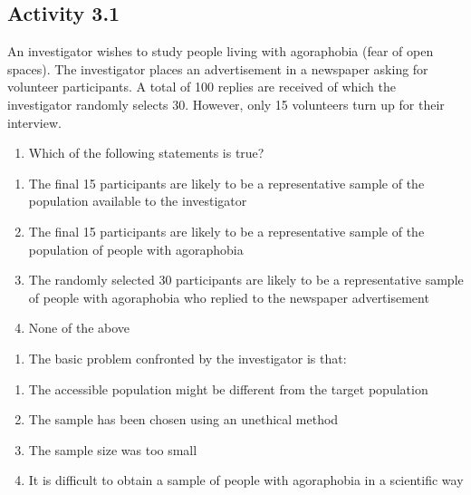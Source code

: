 \documentclass[
]{memoir}
\providecommand{\tightlist}{%
  \setlength{\itemsep}{0pt}\setlength{\parskip}{0pt}}
\begin{document}
\hypertarget{activity-3.1}{%
\subsection*{Activity 3.1}\label{activity-3.1}}

An investigator wishes to study people living with agoraphobia (fear of open spaces). The investigator places an advertisement in a newspaper asking for volunteer participants. A total of 100 replies are received of which the investigator randomly selects 30. However, only 15 volunteers turn up for their interview.

\begin{enumerate}
\def\labelenumi{\arabic{enumi}.}
\tightlist
\item
  Which of the following statements is true?
\end{enumerate}

\begin{enumerate}
\def\labelenumi{\alph{enumi})}
\tightlist
\item
  The final 15 participants are likely to be a representative sample of the population available to the investigator
\item
  The final 15 participants are likely to be a representative sample of the population of people with agoraphobia
\item
  The randomly selected 30 participants are likely to be a representative sample of people with agoraphobia who replied to the newspaper advertisement
\item
  None of the above
\end{enumerate}

\begin{enumerate}
\def\labelenumi{\arabic{enumi}.}
\setcounter{enumi}{1}
\tightlist
\item
  The basic problem confronted by the investigator is that:
\end{enumerate}

\begin{enumerate}
\def\labelenumi{\alph{enumi})}
\tightlist
\item
  The accessible population might be different from the target population
\item
  The sample has been chosen using an unethical method
\item
  The sample size was too small
\item
  It is difficult to obtain a sample of people with agoraphobia in a scientific way
\end{enumerate}
\end{document}
